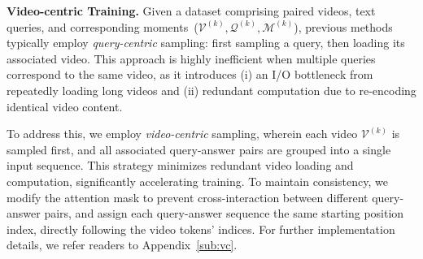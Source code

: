 \noindent \textbf{Video-centric Training.} 
Given a dataset comprising paired videos, text queries, and corresponding moments~(${\mathcal{V}^{(k)}, \mathcal{Q}^{(k)}, \mathcal{M}^{(k)}}$), previous methods typically employ \textit{query-centric} sampling: first sampling a query, then loading its associated video.
This approach is highly inefficient when multiple queries correspond to the same video, as it introduces (i) an I/O bottleneck from repeatedly loading long videos and (ii) redundant computation due to re-encoding identical video content.

To address this, we employ \textit{video-centric} sampling, wherein each video $\mathcal{V}^{(k)}$ is sampled first, and all associated query-answer pairs are grouped into a single input sequence.
This strategy minimizes redundant video loading and computation, significantly accelerating training.
To maintain consistency, we modify the attention mask to prevent cross-interaction between different query-answer pairs, and
assign each query-answer sequence the same starting position index, directly following the video tokens' indices.
For further implementation details, we refer readers to Appendix~\ref{sub:vc}.

